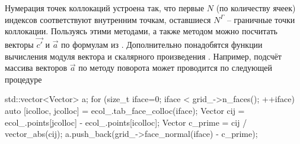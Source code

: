 \begin{itemize}
\begin{itemize}
\end{itemize}
Нумерация точек коллокаций устроена так, что первые $N$ (по количеству ячеек) индексов соответствуют внутренним точкам,
оставшиеся $N^\Gamma$ -- граничные точки коллокации.
Пользуясь этими методами, а также методом 
можно посчитать векторы $\vec{c'}$ и $\vec a$ по формулам из .
Дополнительно понадобятся функции вычисления модуля вектора  и
скалярного произведения .
Например, подсчёт массива векторов $\vec a$ по методу поворота может проводится по следующей процедуре
\begin{cppcode}
std::vector<Vector> a;
for (size_t iface=0; iface < grid_->n_faces(); ++iface){
    auto [icolloc, jcolloc] = ecol_.tab_face_colloc(iface);
    Vector cij = ecol_.points[jcolloc] - ecol_.points[icolloc];
    Vector c_prime = cij / vector_abs(cij);
    a.push_back(grid_->face_normal(iface) - c_prime);
}
\end{cppcode}
\end{itemize}
